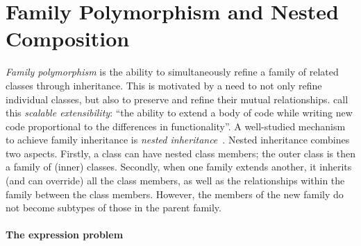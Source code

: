 \section{Family Polymorphism and Nested Composition}
\label{sec:ernst}

\emph{Family polymorphism} is the ability to simultaneously refine a family of
related classes through inheritance. This is motivated by a need to not only
refine individual classes, but also to preserve and refine their mutual
relationships. \citet{Nystrom_2004} call this \emph{scalable extensibility}:
``the ability to extend a body of code while writing new code proportional to
the differences in functionality''.
%
A well-studied mechanism to achieve family inheritance is \emph{nested
inheritance}~\citep{Nystrom_2004}. Nested inheritance combines two aspects.
Firstly, a class can have nested class members; the outer class is then a
family of (inner) classes. Secondly, when one family extends another, it
inherits (and can override) all the class members, as well as the relationships
within the family between the class members. However,
the members of the new family do not become subtypes of those in the parent family.

\paragraph{The expression problem}

